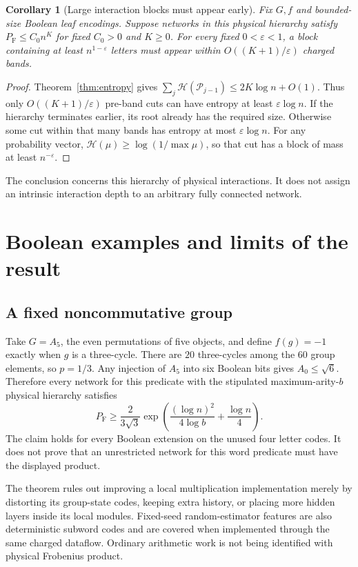 \documentclass[11pt]{article}
\newtheorem{corollary}[theorem]{Corollary}
\theoremstyle{remark}\newtheorem{remark}[theorem]{Remark}
\newcommand{\PF}{P_{\mathrm F}}
\newcommand{\cP}{\mathcal P}
\newcommand{\ent}{\mathcal H}
\begin{document}
\begin{corollary}[Large interaction blocks must appear early]\label{cor:early}
Fix $G,f$ and bounded-size Boolean leaf encodings. Suppose networks in this
physical hierarchy satisfy $\PF\le C_0n^K$ for fixed $C_0>0$ and $K\ge0$. For every fixed
$0<\varepsilon<1$, a block containing at least $n^{1-\varepsilon}$ letters
must appear within $O((K+1)/\varepsilon)$ charged bands.
\end{corollary}
\begin{proof}
Theorem~\ref{thm:entropy} gives
$\sum_j\ent(\cP_{j-1})\le2K\log n+O(1)$. Thus only
$O((K+1)/\varepsilon)$ pre-band cuts can have entropy at least
$\varepsilon\log n$. If the hierarchy terminates earlier, its root already
has the required size. Otherwise some cut within that many bands has entropy
at most $\varepsilon\log n$. For any probability vector,
$\ent(\mu)\ge\log(1/\max\mu)$, so that cut has a block of mass at least
$n^{-\varepsilon}$.
\end{proof}

The conclusion concerns this hierarchy of physical interactions. It does not
assign an intrinsic interaction depth to an arbitrary fully connected network.

\section{Boolean examples and limits of the result}

\subsection{A fixed noncommutative group}

Take $G=A_5$, the even permutations of five objects, and define $f(g)=-1$
exactly when $g$ is a three-cycle. There are $20$ three-cycles among the
$60$ group elements, so $p=1/3$. Any injection of $A_5$ into six Boolean
bits gives $A_0\le\sqrt6$. Therefore every network for this predicate with
the stipulated maximum-arity-$b$ physical hierarchy satisfies
\[
 \PF\ge\frac{2}{3\sqrt3}
       \exp\!\left(\frac{(\log n)^2}{4\log b}+\frac{\log n}{4}\right).
\]
The claim holds for every Boolean extension on the unused four letter codes.
It does not prove that an unrestricted network for this word predicate must
have the displayed product.

The theorem rules out improving a local multiplication implementation merely
by distorting its group-state codes, keeping extra history, or placing more
hidden layers inside its local modules. Fixed-seed random-estimator features
are also deterministic subword codes and are covered when implemented through
the same charged dataflow. Ordinary arithmetic work is not being identified
with physical Frobenius product.
\end{document}

